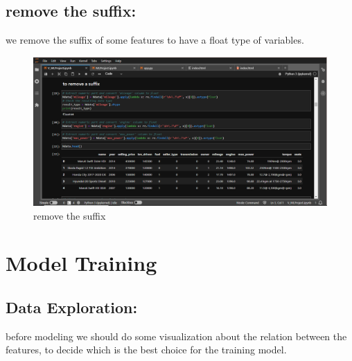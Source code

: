 \documentclass{article}
\begin{document}
\subsection{remove the suffix:}
we remove the suffix of some features to have a float type of variables.

\begin{figure}[h]
    \centering
    \includegraphics[width=1\textwidth]{rm-sufix.png}
    \caption{remove the suffix}
    \label{fig:my_label}
\end{figure}

\section{Model Training}
\subsection{Data Exploration:}
before modeling we should do some visualization about the relation between the features, to decide which is the best choice for the training model.\\
\end{document}

